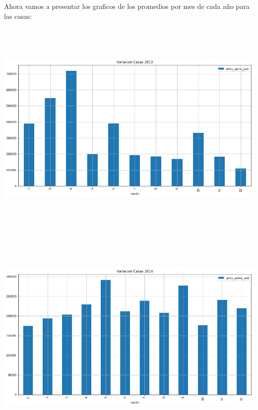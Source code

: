 \documentclass[a4paper, 10pt]{article}
\begin{document}
      Ahora vamos a presentar los graficos de los promedios por mes de cada año para las casas:
      \begin{center}
            \includegraphics[width=6in, height=4.2in]{images/vCasas2013}
      \end{center}
      \begin{center}
            \includegraphics[width=6in, height=4.2in]{images/vCasas2014}
      \end{center}
\end{document}
